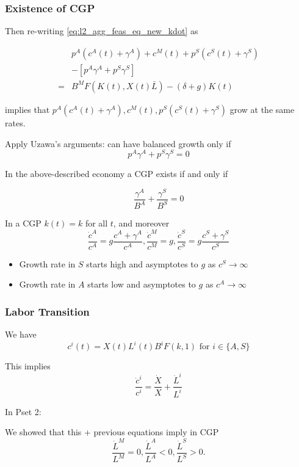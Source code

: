 \documentclass[10pt]{article}
\begin{document}
\subsubsection{Existence of CGP}

Then re-writing \eqref{eq:l2_agg_feas_eq_new_kdot} as 

\begin{align}
    & p^A\left(c^A(t)+\gamma^A\right)+c^M(t)+p^S\left(c^S(t)+\gamma^S\right) \\ 
    & -\left[p^A \gamma^A+p^S \gamma^S\right] \\ 
    = & B^M F(K(t), X(t) \bar{L})-(\delta+g) K(t)
\end{align}

implies that $p^A\left(c^A(t)+\gamma^A\right), c^M(t), p^S\left(c^S(t)+\gamma^S\right)$
grow at the same rates.

Apply Uzawa's arguments: can have balanced growth only if
$$
p^A \gamma^A+p^S \gamma^S=0
$$


\begin{proposition}
    In the above-described economy a CGP exists if and only if

    $$
    \frac{\gamma^A}{B^A}+\frac{\gamma^S}{B^S}=0
    $$

    In a CGP $k(t)=k$ for all $t$, and moreover
    $$
    \frac{\dot{c}^A}{c^A}=g \frac{c^A+\gamma^A}{c^A}, \frac{\dot{c}^M}{c^M}=g, \frac{\dot{c}^S}{c^S}=g \frac{c^S+\gamma^S}{c^S}
    $$

    \begin{itemize}
        \item Growth rate in $S$ starts high and asymptotes to $g$ as $c^S \rightarrow \infty$
        \item Growth rate in $A$ starts low and asymptotes to $g$ as $c^A \rightarrow \infty$
    \end{itemize}

\end{proposition}

\subsubsection{Labor Transition}

We have
$$
c^i(t)=X(t) L^i(t) B^i F(k, 1) \text { for } i \in\{A, S\}
$$

This implies
$$
\frac{\dot{c}^i}{c^i}=\frac{\dot{X}}{X}+\frac{\dot{L}^i}{L^i}
$$

In Pset 2:

We showed that this + previous equations imply in CGP
$$
\frac{\dot{L}^M}{L^M}=0, \frac{\dot{L}^A}{L^A}<0, \frac{\dot{L}^S}{L^S}>0 .
$$
\end{document}
